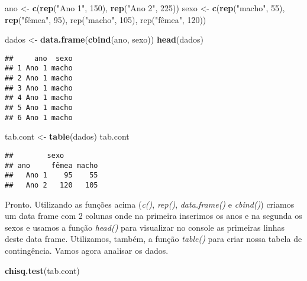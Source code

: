 \documentclass[titlepage, oneside, openany, a4paper]{book}
\newenvironment{Shaded}{\begin{snugshade}}{\end{snugshade}}
\newcommand{\DecValTok}[1]{\textcolor[rgb]{0.00,0.00,0.81}{#1}}
\newcommand{\KeywordTok}[1]{\textcolor[rgb]{0.13,0.29,0.53}{\textbf{#1}}}
\newcommand{\NormalTok}[1]{#1}
\newcommand{\StringTok}[1]{\textcolor[rgb]{0.31,0.60,0.02}{#1}}
\begin{document}
\begin{Shaded}
\begin{Highlighting}[]
\NormalTok{ano <-}\StringTok{ }\KeywordTok{c}\NormalTok{(}\KeywordTok{rep}\NormalTok{(}\StringTok{"Ano 1"}\NormalTok{, }\DecValTok{150}\NormalTok{), }\KeywordTok{rep}\NormalTok{(}\StringTok{"Ano 2"}\NormalTok{, }\DecValTok{225}\NormalTok{))}
\NormalTok{sexo <-}\StringTok{ }\KeywordTok{c}\NormalTok{(}\KeywordTok{rep}\NormalTok{(}\StringTok{"macho"}\NormalTok{, }\DecValTok{55}\NormalTok{), }\KeywordTok{rep}\NormalTok{(}\StringTok{"fêmea", 95), rep("}\NormalTok{macho}\StringTok{", 105), rep("}\NormalTok{fêmea", }\DecValTok{120}\NormalTok{))}

\NormalTok{dados <-}\StringTok{ }\KeywordTok{data.frame}\NormalTok{(}\KeywordTok{cbind}\NormalTok{(ano, sexo))}
\KeywordTok{head}\NormalTok{(dados)}
\end{Highlighting}
\end{Shaded}

\begin{verbatim}
##     ano  sexo
## 1 Ano 1 macho
## 2 Ano 1 macho
## 3 Ano 1 macho
## 4 Ano 1 macho
## 5 Ano 1 macho
## 6 Ano 1 macho
\end{verbatim}

\begin{Shaded}
\begin{Highlighting}[]
\NormalTok{tab.cont <-}\StringTok{ }\KeywordTok{table}\NormalTok{(dados)}
\NormalTok{tab.cont}
\end{Highlighting}
\end{Shaded}

\begin{verbatim}
##        sexo
## ano     fêmea macho
##   Ano 1    95    55
##   Ano 2   120   105
\end{verbatim}

Pronto. Utilizando as funções acima (\emph{c()}, \emph{rep()}, \emph{data.frame()} e \emph{cbind()}) criamos um data frame com 2 colunas onde na primeira inserimos os anos e na segunda os sexos e usamos a função \emph{head()} para visualizar no console as primeiras linhas deste data frame. Utilizamos, também, a função \emph{table()} para criar nossa tabela de contingência. Vamos agora analisar os dados.

\begin{Shaded}
\begin{Highlighting}[]
\KeywordTok{chisq.test}\NormalTok{(tab.cont)}
\end{Highlighting}
\end{Shaded}
\end{document}

